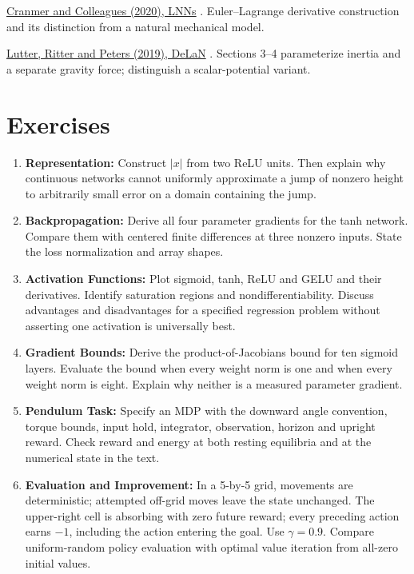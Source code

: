 \href{https://arxiv.org/abs/2003.04630}{Cranmer and Colleagues (2020), LNNs} \cite{cranmer2020lagrangian}. Euler--Lagrange derivative construction and its distinction from a natural mechanical model.

\href{https://www.ias.informatik.tu-darmstadt.de/uploads/Team/MichaelLutter/lutter_iclr_2019.pdf}{Lutter, Ritter and Peters (2019), DeLaN} \cite{lutter2019review}. Sections 3--4 parameterize inertia and a separate gravity force; distinguish a scalar-potential variant.

\section{Exercises}

\begin{enumerate}
\item \textbf{Representation:} Construct $|x|$ from two ReLU units. Then explain why continuous networks cannot uniformly approximate a jump of nonzero height to arbitrarily small error on a domain containing the jump.
\item \textbf{Backpropagation:} Derive all four parameter gradients for the tanh network. Compare them with centered finite differences at three nonzero inputs. State the loss normalization and array shapes.
\item \textbf{Activation Functions:} Plot sigmoid, tanh, ReLU and GELU and their derivatives. Identify saturation regions and nondifferentiability. Discuss advantages and disadvantages for a specified regression problem without asserting one activation is universally best.
\item \textbf{Gradient Bounds:} Derive the product-of-Jacobians bound for ten sigmoid layers. Evaluate the bound when every weight norm is one and when every weight norm is eight. Explain why neither is a measured parameter gradient.
\item \textbf{Pendulum Task:} Specify an MDP with the downward angle convention, torque bounds, input hold, integrator, observation, horizon and upright reward. Check reward and energy at both resting equilibria and at the numerical state in the text.
\item \textbf{Evaluation and Improvement:} In a 5-by-5 grid, movements are deterministic; attempted off-grid moves leave the state unchanged. The upper-right cell is absorbing with zero future reward; every preceding action earns $-1$, including the action entering the goal. Use $\gamma=0.9$. Compare uniform-random policy evaluation with optimal value iteration from all-zero initial values.

\end{enumerate}
